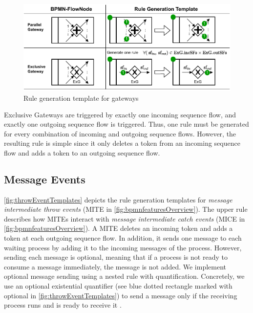 \documentclass[runningheads]{llncs}
\begin{document}
\begin{figure}[ht]
    \centering
    \includegraphics[width=1\textwidth]{images/gateways_template.pdf}
    \caption{Rule generation template for gateways}
    \label{fig:gatewayTemplates}
\end{figure}

Exclusive Gateways are triggered by exactly one incoming sequence flow, and exactly one outgoing sequence flow is triggered.
Thus, one rule must be generated for every combination of incoming and outgoing sequence flows.
However, the resulting rule is simple since it only deletes a token from an incoming sequence flow and adds a token to an outgoing sequence flow.

\subsection{Message Events}
\autoref{fig:throwEventTemplates} depicts the rule generation templates for \textit{message intermediate throw events} (\textsf{MITE} in \autoref{fig:bpmnfeaturesOverview}).
The upper rule describes how MITEs interact with \textit{message intermediate catch events} (\textsf{MICE} in \autoref{fig:bpmnfeaturesOverview}).
A MITE deletes an incoming token and adds a token at each outgoing sequence flow.
In addition, it sends one message to each waiting process by adding it to the incoming messages of the process.
However, sending each message is optional, meaning that if a process is not ready to consume a message immediately, the message is not added.
We implement optional message sending using a nested rule with quantification.
Concretely, we use an optional existential quantifier (see blue dotted rectangle marked with optional in \autoref{fig:throwEventTemplates}) to send a message only if the receiving process runs and is ready to receive it \cite{rensinkNestedQuantificationGraph2006}.
\end{document}
